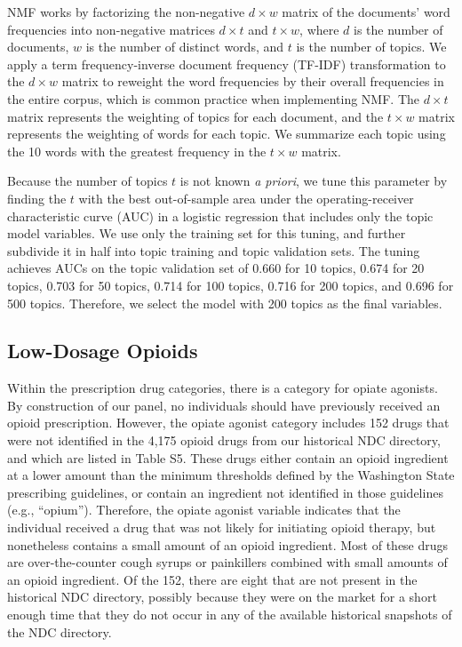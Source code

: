\documentclass[10pt, letter]{article}
\begin{document}
NMF works by factorizing the non-negative $d \times w$ matrix of the documents' word frequencies into non-negative matrices $d \times t$ and $t \times w$, where $d$ is the number of documents, $w$ is the number of distinct words, and $t$ is the number of topics. We apply a term frequency-inverse document frequency (TF-IDF) transformation to the $d \times w$ matrix to reweight the word frequencies by their overall frequencies in the entire corpus, which is common practice when implementing NMF. The $d \times t$ matrix represents the weighting of topics for each document, and the $t \times w$ matrix represents the weighting of words for each topic. We summarize each topic using the 10 words with the greatest frequency in the $t \times w$ matrix.

Because the number of topics $t$ is not known \emph{a priori}, we tune this parameter by finding the $t$ with the best out-of-sample area under the operating-receiver characteristic curve (AUC) in a logistic regression that includes only the topic model variables. We use only the training set for this tuning, and further subdivide it in half into topic training and topic validation sets. The tuning achieves AUCs on the topic validation set of 0.660 for 10 topics, 0.674 for 20 topics, 0.703 for 50 topics, 0.714 for 100 topics, 0.716 for 200 topics, and 0.696 for 500 topics. Therefore, we select the model with 200 topics as the final variables.

\subsection{Low-Dosage Opioids}

Within the prescription drug categories, there is a category for opiate agonists. By construction of our panel, no individuals should have previously received an opioid prescription. However, the opiate agonist category includes 152 drugs that were not identified in the 4,175 opioid drugs from our historical NDC directory, and which are listed in Table S5. These drugs either contain an opioid ingredient at a lower amount than the minimum thresholds defined by the Washington State prescribing guidelines, or contain an ingredient not identified in those guidelines (e.g., ``opium''). Therefore, the opiate agonist variable indicates that the individual received a drug that was not likely for initiating opioid therapy, but nonetheless contains a small amount of an opioid ingredient. Most of these drugs are over-the-counter cough syrups or painkillers combined with small amounts of an opioid ingredient. Of the 152, there are eight that are not present in the historical NDC directory, possibly because they were on the market for a short enough time that they do not occur in any of the available historical snapshots of the NDC directory.
\end{document}
